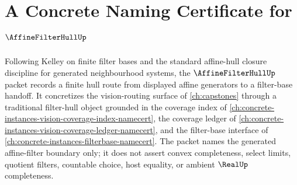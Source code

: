 \chapter{A Concrete Naming Certificate for $\AffineFilterHullUp$}
\label{ch:concrete-instances-affine-filter-hull-namecert}

Following Kelley on finite filter bases and the standard affine-hull closure discipline for generated neighbourhood systems, the $\AffineFilterHullUp$ packet records a finite hull route from displayed affine generators to a filter-base handoff. It concretizes the vision-routing surface of \autoref{ch:capstones} through a traditional filter-hull object grounded in the coverage index of \autoref{ch:concrete-instances-vision-coverage-index-namecert}, the coverage ledger of \autoref{ch:concrete-instances-vision-coverage-ledger-namecert}, and the filter-base interface of \autoref{ch:concrete-instances-filterbase-namecert}. The packet names the generated affine-filter boundary only; it does not assert convex completeness, select limits, quotient filters, countable choice, host equality, or ambient $\RealUp$ completeness.

